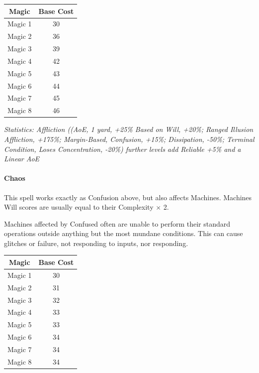 \begin{multicols}{3}
	\begin{center}
		\begin{tabular}{|c|c|}
			\hline
			Magic & Base Cost \\
			\hline
			\hline
			Magic 1 & 30 \\
			Magic 2 & 36 \\
			Magic 3 & 39 \\
			Magic 4 & 42 \\
			Magic 5 & 43 \\
			Magic 6 & 44 \\
			Magic 7 & 45 \\
			Magic 8 & 46 \\
			\hline
		\end{tabular}
	\end{center}
	
	\textcolor{OliveGreen}{\textit{Statistics: Affliction ((AoE, 1 yard, +25\% Based on Will, +20\%; Ranged Illusion Affliction, +175\%; Margin-Based, Confusion, +15\%; Dissipation, -50\%; Terminal Condition, Loses Concentration, -20\%)  further levels add Reliable +5\% and a Linear AoE}}
	
	\paragraph{Chaos}
	
	This spell works exactly as Confusion above, but also affects Machines. Machines Will scores are usually equal to their Complexity $\times$ 2.
	
	Machines affected by Confused often are unable to perform their standard operations outside anything but the most mundane conditions. This can cause glitches or failure, not responding to inputs, nor responding.
	
	\begin{center}
		\begin{tabular}{|c|c|}
			\hline
			Magic & Base Cost \\
			\hline
			\hline
			Magic 1 & 30 \\
			Magic 2 & 31 \\
			Magic 3 & 32 \\
			Magic 4 & 33 \\
			Magic 5 & 33 \\
			Magic 6 & 34 \\
			Magic 7 & 34 \\
			Magic 8 & 34 \\
			\hline
		\end{tabular}
	\end{center}	
	

\end{multicols}

